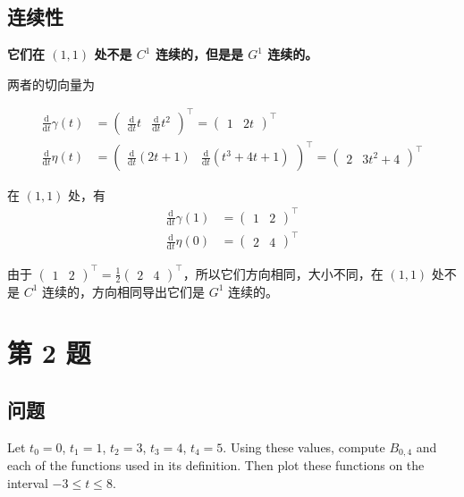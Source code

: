 \documentclass[math-font=newcm]{sjtuarticle}
\def\dd{\mathrm{d}}
\begin{document}
\subsection{连续性}

\textbf{它们在 $(1,1)$ 处不是 $C^1$ 连续的，但是是 $G^1$ 连续的。}

两者的切向量为

\begin{align}
    \frac{\dd}{\dd t}\gamma (t)&=\begin{pmatrix}\frac{\dd}{\dd t}t &\frac{\dd}{\dd t}t^2\end{pmatrix}^\top=\begin{pmatrix}1 & 2t \end{pmatrix}^\top \\
    \frac{\dd}{\dd t}\eta (t)&=\begin{pmatrix}\frac{\dd}{\dd t}(2t+1) &\frac{\dd}{\dd t}(t^3+4t+1)\end{pmatrix}^\top=\begin{pmatrix} 2 & 3t^2+4 \end{pmatrix}^\top
\end{align}

在 $(1,1)$ 处，有
\begin{align}
    \frac{\dd}{\dd t}\gamma (1)&=\begin{pmatrix}1 & 2 \end{pmatrix}^\top\\
    \frac{\dd}{\dd t}\eta (0)&=\begin{pmatrix} 2 & 4 \end{pmatrix}^\top
\end{align}

由于 $\begin{pmatrix}1 & 2 \end{pmatrix}^\top=\frac{1}{2}\begin{pmatrix} 2 & 4 \end{pmatrix}^\top$，所以它们方向相同，大小不同，在 $(1,1)$ 处不是 $C^1$ 连续的，方向相同导出它们是 $G^1$ 连续的。

\section{第 2 题}
\subsection{问题}
Let $t_0=0$, $t_1=1$, $t_2=3$, $t_3=4$, $t_4=5$. Using these values, compute $B_{0,4}$ and each of the functions used in its definition. Then plot these functions on the interval $-3\leq t\leq 8$.
\end{document}
